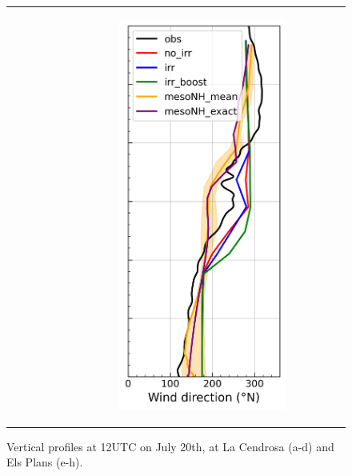 \begin{figure}[hbtp]
{\begin{tabular}{@{}cccc@{}}
\begin{subfigure}[t]{0.283\textwidth}
        \end{subfigure} &
        \begin{subfigure}[t]{0.283\textwidth}
            \caption{}
            \includegraphics[width=\textwidth]{images/chap5/profiles/profile_elsplans_wind_direction_2007_.png}
        \end{subfigure} \\
    \end{tabular}
    }
    \caption{Vertical profiles at 12UTC on July 20th, at La Cendrosa (a-d) and Els Plans (e-h).}
    \label{fig:profiles_cendrosa_2007}
\end{figure}

